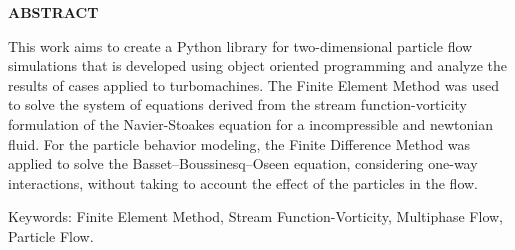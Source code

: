 \begin{center}
\textbf{ABSTRACT}
\end{center}

$\!$\\


This work aims to create a Python library for two-dimensional particle flow simulations that is developed using object oriented programming and analyze the results of cases applied to turbomachines.
The Finite Element Method was used to solve the system of equations derived from the stream function-vorticity formulation of the Navier-Stoakes equation for a incompressible and newtonian fluid.
For the particle behavior modeling, the Finite Difference Method was applied to solve the Basset–Boussinesq–Oseen equation, considering one-way interactions, without taking to account the effect of the particles in the flow.

\vspace{1cm}

\hspace{-1.3cm}Keywords: Finite Element Method, Stream Function-Vorticity, Multiphase Flow, Particle Flow.